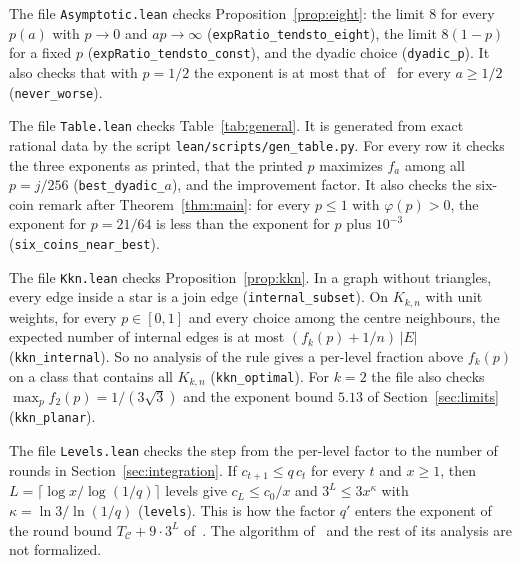 \documentclass[11pt]{article}
\theoremstyle{remark}
\begin{document}
The file \texttt{Asymptotic.lean} checks Proposition~\ref{prop:eight}: the limit $8$ for every $p(a)$
with $p\to0$ and $ap\to\infty$ (\texttt{expRatio\_tendsto\_eight}), the limit $8(1-p)$ for a fixed
$p$ (\texttt{expRatio\_tendsto\_const}), and the dyadic choice (\texttt{dyadic\_p}). It also checks that
with $p=1/2$ the exponent is at most that of~\cite{AS26} for every $a\ge1/2$ (\texttt{never\_worse}).

The file \texttt{Table.lean} checks Table~\ref{tab:general}. It is generated from exact rational
data by the script \texttt{lean/scripts/gen\_table.py}. For every row it checks the three
exponents as printed, that the printed $p$ maximizes $f_a$ among all $p=j/256$
(\texttt{best\_dyadic\_}$a$), and the improvement factor. It also checks the six-coin remark after
Theorem~\ref{thm:main}: for every $p\le1$ with $\varphi(p)>0$, the exponent for $p=21/64$ is less
than the exponent for $p$ plus $10^{-3}$ (\texttt{six\_coins\_near\_best}).

The file \texttt{Kkn.lean} checks Proposition~\ref{prop:kkn}. In a graph without triangles, every
edge inside a star is a join edge (\texttt{internal\_subset}). On $K_{k,n}$ with unit weights, for
every $p\in[0,1]$ and every choice among the centre neighbours, the expected number of internal
edges is at most $(f_k(p)+1/n)\,|E|$ (\texttt{kkn\_internal}). So no analysis of the rule gives a
per-level fraction above $f_k(p)$ on a class that contains all $K_{k,n}$ (\texttt{kkn\_optimal}).
For $k=2$ the file also checks $\max_pf_2(p)=1/(3\sqrt3)$ and the exponent bound $5.13$ of
Section~\ref{sec:limits} (\texttt{kkn\_planar}).

The file \texttt{Levels.lean} checks the step from the per-level factor to the number of rounds in
Section~\ref{sec:integration}. If $c_{t+1}\le q\,c_t$ for every $t$ and $x\ge1$, then
$L=\lceil\log x/\log(1/q)\rceil$ levels give $c_L\le c_0/x$ and $3^L\le3x^{\kappa}$ with
$\kappa=\ln3/\ln(1/q)$ (\texttt{levels}). This is how the factor $q'$ enters the exponent of the
round bound $T_{\mathcal C}+9\cdot3^L$ of~\cite[Thm.~5.4]{AS26}. The algorithm of~\cite{AS26} and the
rest of its analysis are not formalized.
\end{document}
